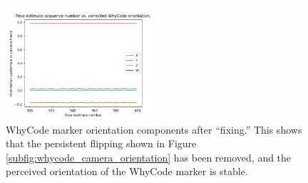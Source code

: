 
\begin{figure}[h!]
    \centering
    \includegraphics[width=0.5\textwidth]{images/whycode_camera_orientation_constrained_corrected.png}
    \caption[WhyCode marker orientation components after ``fixing.'']{WhyCode marker orientation components after ``fixing.'' This shows that the persistent flipping shown in Figure \ref{subfig:whycode_camera_orientation} has been removed, and the perceived orientation of the WhyCode marker is stable.}
    \label{fig:whycode_problems_corrected}
\end{figure}

